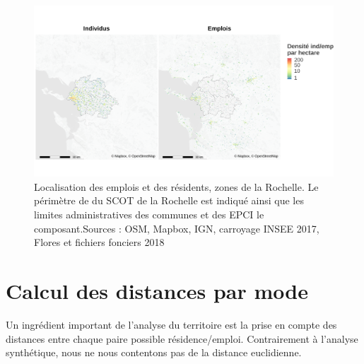 \documentclass[
  10pt,
  a4paper,
  numbers=noendperiod,
  DIV=9]{scrartcl}
\begin{document}
\begin{figure}[htb]

{\centering \includegraphics[width=1\textwidth,height=\textheight]{output/popemp.png}

}

\caption[Localisation des résidents et des
emplois]{\label{fig-zoneslr}Localisation des emplois et des résidents,
zones de la Rochelle. Le périmètre de du SCOT de la Rochelle est indiqué
ainsi que les limites administratives des communes et des EPCI le
composant.Sources : OSM, Mapbox, IGN, carroyage INSEE 2017, Flores et
fichiers fonciers 2018}

\end{figure}

\hypertarget{sec-distancesparmode}{%
\section{Calcul des distances par mode}\label{sec-distancesparmode}}

Un ingrédient important de l'analyse du territoire est la prise en
compte des distances entre chaque paire possible résidence/emploi.
Contrairement à l'analyse synthétique, nous ne nous contentons pas de la
distance euclidienne.
\end{document}

